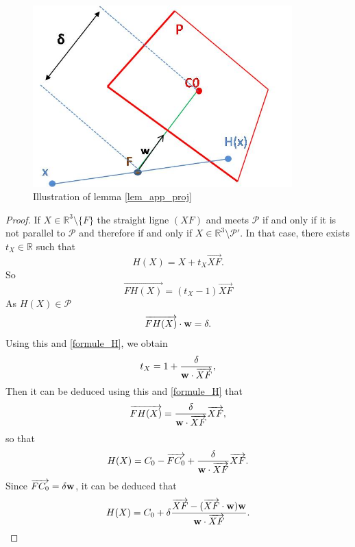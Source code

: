 \begin{figure}[h!]

\centering
\includegraphics[width=10cm]{schema_lemme_1_bis.jpg}
\caption{Illustration of lemma \ref{lem_app_proj}}
\label{shmlemme1}
\end{figure}

\begin{proof}
If $X\in \mathbb{R}^3 \setminus \{F\}$ the straight ligne $(XF)$ and meets $\mathcal{P}$ if and only if it is not parallel to  $\mathcal{P}$ and therefore if and only if $X\in \mathbb{R}^3 \setminus \mathcal{P}'$. In that case, there exists $t_X\in \mathbb{R}$ such that
\begin{equation}
H(X)=X+t_{X}\overrightarrow{XF}.
\end{equation}
So
\begin{equation}
\overrightarrow{FH(X)} = (t_X-1)\overrightarrow{XF}
\label{formule_H}
\end{equation}
As $H(X)\in \mathcal{P}$
\begin{equation*}
\overrightarrow{FH(X)}\cdot \mathbf{w} =\delta.
\end{equation*}
Using this and \eqref{formule_H}, we obtain 
\begin{equation*}
t_{X}=1+\frac{\delta}{\mathbf{w} \cdot \overrightarrow{XF}},
\end{equation*}
 Then it can be deduced using this and \eqref{formule_H} that
 \begin{equation*}
 \overrightarrow{FH(X)}=\frac{\delta}{\mathbf{w} \cdot \overrightarrow{XF}}\overrightarrow{XF},
 \end{equation*}
 so that
 \begin{equation*}
 H(X)=C_0-\overrightarrow{FC_0}+\frac{\delta}{\mathbf{w} \cdot \overrightarrow{XF}}\overrightarrow{XF}.
 \end{equation*}
 Since $\overrightarrow{FC_0}=\delta\mathbf{w}$, it can be deduced that
\begin{equation*}
H(X) = C_0 +  \delta \frac{\overrightarrow{XF}-(\overrightarrow{XF}\cdot \mathbf{w} )\mathbf{w}}{\mathbf{w} \cdot \overrightarrow{XF}}.
\end{equation*}
\end{proof}



